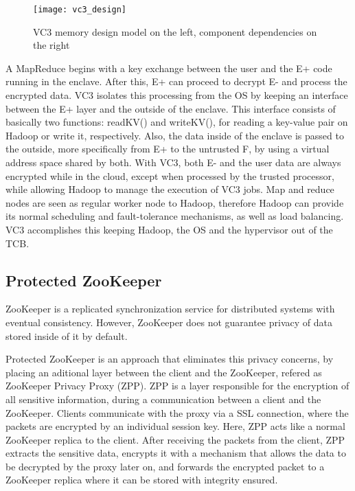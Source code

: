 \begin{figure}[htbp]
	\centering
	{\texttt{[image: vc3\_design]}}%
	\caption{VC3 memory design model on the left, component dependencies on the right}
\end{figure}

A MapReduce begins with a key exchange between the user and the E+ code running in the enclave. After this, E+ can proceed to decrypt E- and process the encrypted data. VC3 isolates this processing from the OS by keeping an interface between the E+ layer and the outside of the enclave. This interface consists of basically two functions: readKV() and writeKV(), for reading a key-value pair on Hadoop or write it, respectively. Also, the data inside of the enclave is passed to the outside, more specifically from E+ to the untrusted F, by using a virtual address space shared by both.
With VC3, both E- and the user data are always encrypted while in the cloud, except when processed by the trusted processor, while allowing Hadoop to manage the execution of VC3 jobs. Map and reduce nodes are seen as regular worker node to Hadoop, therefore Hadoop can provide its normal scheduling and fault-tolerance mechanisms, as well as load balancing. VC3 accomplishes this keeping Hadoop, the OS and the hypervisor out of the TCB.




\subsection{Protected ZooKeeper}
\label{ssec:protected_zookeeper}

ZooKeeper \cite{zookeeper} is a replicated synchronization service for distributed systems with eventual consistency. However, ZooKeeper does not guarantee privacy of data stored inside of it by default.
 
Protected ZooKeeper \cite{protectedZooKeeper} is an approach that eliminates this privacy concerns, by placing an aditional layer between the client and the ZooKeeper, refered as ZooKeeper Privacy Proxy (ZPP). ZPP is a layer responsible for the encryption of all sensitive information, during a communication between a client and the ZooKeeper. 
Clients communicate with the proxy via a SSL connection, where the packets are encrypted by an individual session key. Here, ZPP acts like a normal ZooKeeper replica to the client. 
After receiving the packets from the client, ZPP extracts the sensitive data, encrypts it with a mechanism that allows the data to be decrypted by the proxy later on, and forwards the encrypted packet to a ZooKeeper replica where it can be stored with integrity ensured.
 
